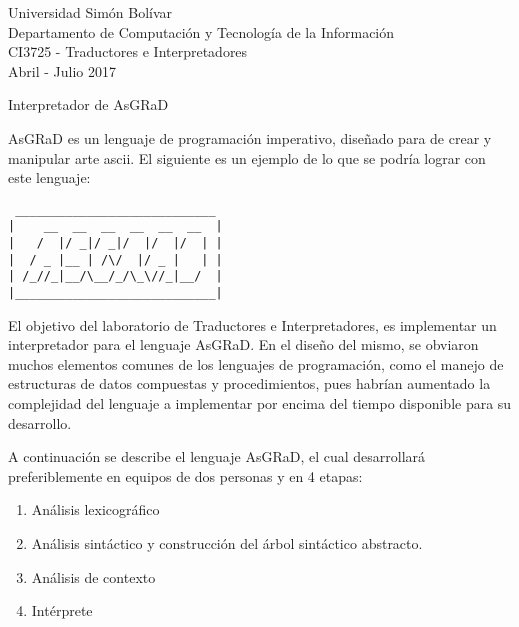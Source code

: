\documentclass[letterpaper,11pt]{article}
\newcommand{\asgrad}{AsGRaD\xspace}
\begin{document}
\begin{flushleft}
Universidad Simón Bolívar\\
Departamento de Computación y Tecnología de la Información\\
CI3725 - Traductores e Interpretadores\\
Abril - Julio 2017\\
\end{flushleft}

\vspace{1em}

\begin{center}
{\Large
Interpretador de \asgrad
}
\end{center}

\vspace{1em}

\asgrad es un lenguaje de programación imperativo, diseñado para de crear y manipular arte ascii. El siguiente es un ejemplo de lo que se podría lograr con este lenguaje:

\vspace{1em}

\begin{center}
{
\begin{BVerbatim}
 ____________________________ 
|    __  __  __  __  __  __  |
|   /  |/ _|/ _|/  |/  |/  | |
|  / _ |__ | /\/  |/ _ |   | |
| /_//_|__/\__/_/\_\//_|__/  |
|____________________________|

\end{BVerbatim}
}
\end{center}


El objetivo del laboratorio de Traductores e Interpretadores, es implementar un interpretador para el lenguaje \asgrad. En el diseño del mismo, se obviaron muchos elementos
comunes de los lenguajes de programación, como el manejo de estructuras de datos compuestas y procedimientos, pues habrían aumentado la complejidad del lenguaje a implementar por encima del tiempo disponible para su desarrollo.

A continuación se describe el lenguaje \asgrad, el cual desarrollará preferiblemente en equipos de dos personas y en 4 etapas:
\begin{enumerate}[i]
  \item Análisis lexicográfico
  \item Análisis sintáctico y construcción del árbol sintáctico abstracto.
  \item Análisis de contexto
  \item Intérprete
\end{enumerate}
\end{document}
